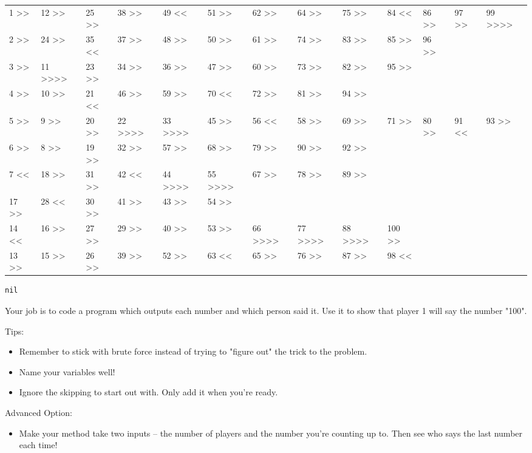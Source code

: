 \documentclass[11pt]{article}
\begin{document}
\begin{center}
\begin{tabular}{lllllllllllll}
1 >> & 12 >> & 25 >> & 38 >> & 49 << & 51 >> & 62 >> & 64 >> & 75 >> & 84 << & 86 >> & 97 >> & 99 >>>>\\
2 >> & 24 >> & 35 << & 37 >> & 48 >> & 50 >> & 61 >> & 74 >> & 83 >> & 85 >> & 96 >> &  & \\
3 >> & 11 >>>> & 23 >> & 34 >> & 36 >> & 47 >> & 60 >> & 73 >> & 82 >> & 95 >> &  &  & \\
4 >> & 10 >> & 21 << & 46 >> & 59 >> & 70 << & 72 >> & 81 >> & 94 >> &  &  &  & \\
5 >> & 9 >> & 20 >> & 22 >>>> & 33 >>>> & 45 >> & 56 << & 58 >> & 69 >> & 71 >> & 80 >> & 91 << & 93 >>\\
6 >> & 8 >> & 19 >> & 32 >> & 57 >> & 68 >> & 79 >> & 90 >> & 92 >> &  &  &  & \\
7 << & 18 >> & 31 >> & 42 << & 44 >>>> & 55 >>>> & 67 >> & 78 >> & 89 >> &  &  &  & \\
17 >> & 28 << & 30 >> & 41 >> & 43 >> & 54 >> &  &  &  &  &  &  & \\
14 << & 16 >> & 27 >> & 29 >> & 40 >> & 53 >> & 66 >>>> & 77 >>>> & 88 >>>> & 100 >> &  &  & \\
13 >> & 15 >> & 26 >> & 39 >> & 52 >> & 63 << & 65 >> & 76 >> & 87 >> & 98 << &  &  & \\
\end{tabular}
\end{center}


\begin{verbatim}
nil
\end{verbatim}


Your job is to code a program which outputs each number and which person said 
it. Use it to show that  player 1 will say the number "100".

Tips:

\begin{itemize}
\item Remember to stick with brute force instead of trying to "figure out" the 
trick to the problem.
\item Name your variables well!
\item Ignore the skipping to start out with. Only add it when you're ready.
\end{itemize}


Advanced Option:

\begin{itemize}
\item Make your method take two inputs -- the number of players and the number 
you're counting up to. Then see who says the last number each time!
\end{itemize}
\end{document}
